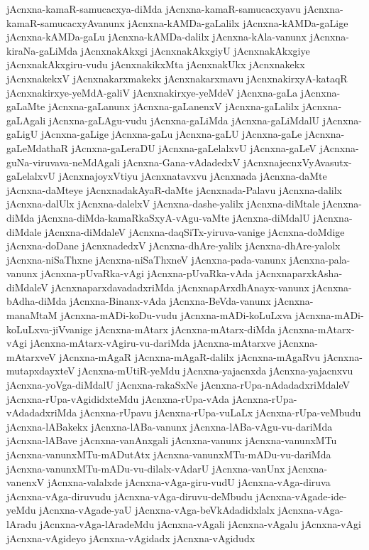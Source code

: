{jAcnxna-kamaR-samucacxya-diMda
jAcnxna-kamaR-samucacxyavu
jAcnxna-kamaR-samucacxyAvanunx
jAcnxna-kAMDa-gaLalilx
jAcnxna-kAMDa-gaLige
jAcnxna-kAMDa-gaLu
jAcnxna-kAMDa-dalilx
jAcnxna-kAla-vanunx
jAcnxna-kiraNa-gaLiMda
jAcnxnakAkxgi
jAcnxnakAkxgiyU
jAcnxnakAkxgiye
jAcnxnakAkxgiru-vudu
jAcnxnakikxMta
jAcnxnakUkx
jAcnxnakekx
jAcnxnakekxV
jAcnxnakarxmakekx
jAcnxnakarxmavu
jAcnxnakirxyA-kataqR
jAcnxnakirxye-yeMdA-galiV
jAcnxnakirxye-yeMdeV
jAcnxna-gaLa
jAcnxna-gaLaMte
jAcnxna-gaLanunx
jAcnxna-gaLanenxV
jAcnxna-gaLalilx
jAcnxna-gaLAgali
jAcnxna-gaLAgu-vudu
jAcnxna-gaLiMda
jAcnxna-gaLiMdalU
jAcnxna-gaLigU
jAcnxna-gaLige
jAcnxna-gaLu
jAcnxna-gaLU
jAcnxna-gaLe
jAcnxna-gaLeMdathaR
jAcnxna-gaLeraDU
jAcnxna-gaLelalxvU
jAcnxna-gaLeV
jAcnxna-guNa-viruvava-neMdAgali
jAcnxna-Gana-vAdadedxV
jAcnxnajecnxVyAvasutx-gaLelalxvU
jAcnxnajoyxVtiyu
jAcnxnatavxvu
jAcnxnada
jAcnxna-daMte
jAcnxna-daMteye
jAcnxnadakAyaR-daMte
jAcnxnada-Palavu
jAcnxna-dalilx
jAcnxna-dalUlx
jAcnxna-dalelxV
jAcnxna-dashe-yalilx
jAcnxna-diMtale
jAcnxna-diMda
jAcnxna-diMda-kamaRkaSxyA-vAgu-vaMte
jAcnxna-diMdalU
jAcnxna-diMdale
jAcnxna-diMdaleV
jAcnxna-daqSiTx-yiruva-vanige
jAcnxna-doMdige
jAcnxna-doDane
jAcnxnadedxV
jAcnxna-dhAre-yalilx
jAcnxna-dhAre-yalolx
jAcnxna-niSaThxne
jAcnxna-niSaThxneV
jAcnxna-pada-vanunx
jAcnxna-pala-vanunx
jAcnxna-pUvaRka-vAgi
jAcnxna-pUvaRka-vAda
jAcnxnaparxkAsha-diMdaleV
jAcnxnaparxdavadadxriMda
jAcnxnapArxdhAnayx-vanunx
jAcnxna-bAdha-diMda
jAcnxna-Binanx-vAda
jAcnxna-BeVda-vanunx
jAcnxna-manaMtaM
jAcnxna-mADi-koDu-vudu
jAcnxna-mADi-koLuLxva
jAcnxna-mADi-koLuLxva-jiVvanige
jAcnxna-mAtarx
jAcnxna-mAtarx-diMda
jAcnxna-mAtarx-vAgi
jAcnxna-mAtarx-vAgiru-vu-dariMda
jAcnxna-mAtarxve
jAcnxna-mAtarxveV
jAcnxna-mAgaR
jAcnxna-mAgaR-dalilx
jAcnxna-mAgaRvu
jAcnxna-mutapxdayxteV
jAcnxna-mUtiR-yeMdu
jAcnxna-yajacnxda
jAcnxna-yajacnxvu
jAcnxna-yoVga-diMdalU
jAcnxna-rakaSxNe
jAcnxna-rUpa-nAdadadxriMdaleV
jAcnxna-rUpa-vAgididxteMdu
jAcnxna-rUpa-vAda
jAcnxna-rUpa-vAdadadxriMda
jAcnxna-rUpavu
jAcnxna-rUpa-vuLaLx
jAcnxna-rUpa-veMbudu
jAcnxna-lABakekx
jAcnxna-lABa-vanunx
jAcnxna-lABa-vAgu-vu-dariMda
jAcnxna-lABave
jAcnxna-vanAnxgali
jAcnxna-vanunx
jAcnxna-vanunxMTu
jAcnxna-vanunxMTu-mADutAtx
jAcnxna-vanunxMTu-mADu-vu-dariMda
jAcnxna-vanunxMTu-mADu-vu-dilalx-vAdarU
jAcnxna-vanUnx
jAcnxna-vanenxV
jAcnxna-valalxde
jAcnxna-vAga-giru-vudU
jAcnxna-vAga-diruva
jAcnxna-vAga-diruvudu
jAcnxna-vAga-diruvu-deMbudu
jAcnxna-vAgade-ide-yeMdu
jAcnxna-vAgade-yaU
jAcnxna-vAga-beVkAdadidxlalx
jAcnxna-vAga-lAradu
jAcnxna-vAga-lAradeMdu
jAcnxna-vAgali
jAcnxna-vAgalu
jAcnxna-vAgi
jAcnxna-vAgideyo
jAcnxna-vAgidadx
jAcnxna-vAgidudx
}
